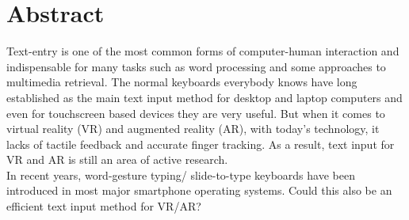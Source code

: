 \chapter{Abstract}
Text-entry is one of the most common forms of computer-human interaction and indispensable for many tasks such as word processing and some approaches to multimedia retrieval. The normal keyboards everybody knows have long established as the main text input method for desktop and laptop computers and even for touchscreen based devices they are very useful. But when it comes to virtual reality (VR) and augmented reality (AR), with today's technology, it lacks of tactile feedback and accurate finger tracking. As a result, text input for VR and AR is still an area of active research.\\
In recent years, word-gesture typing/ slide-to-type keyboards have been introduced in most major smartphone operating systems. Could this also be an efficient text input method for VR/AR?